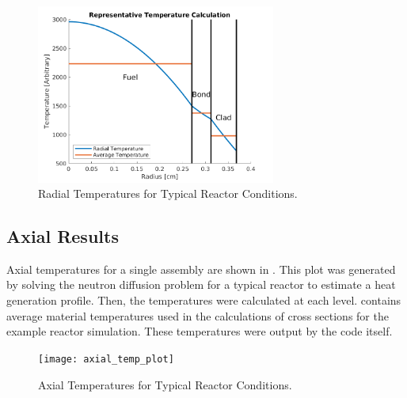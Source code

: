     \begin{figure}
      \centering
      \includegraphics[width=0.7\textwidth]{radial_temp_plot}
      \caption{Radial Temperatures for Typical Reactor Conditions.}
      \label{fig:radial_temp_plot}
    \end{figure}

  \subsection{Axial Results}
    Axial temperatures for a single assembly are shown in
    . This plot was generated by solving the neutron
    diffusion problem for a typical reactor to estimate a heat generation
    profile. Then, the temperatures were calculated at each level.
     contains average material temperatures used in
    the calculations of cross sections for the example reactor simulation. These
    temperatures were output by the code itself.

    \begin{figure}
      \centering
      \texttt{[image: axial\_temp\_plot]}
      \caption{Axial Temperatures for Typical Reactor Conditions.}
      \label{fig:axial_temp_plot}
    \end{figure}
